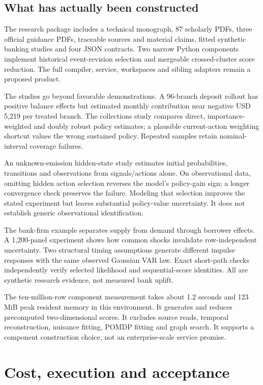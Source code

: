 \documentclass[11pt,a4paper,openany]{book}
\begin{document}
\section*{What has actually been constructed}
The research package includes a technical monograph, 87 scholarly PDFs,
three official guidance PDFs, traceable sources and material claims, fitted
synthetic banking studies and four JSON contracts. Two narrow Python
components implement historical event-revision selection and mergeable
crossed-cluster score reduction. The full compiler, service, workspaces
and sibling adapters remain a proposed product.

The studies go beyond favorable demonstrations. A 96-branch deposit rollout
has positive balance effects but estimated monthly contribution near negative
USD\,5,219 per treated branch. The collections study compares direct,
importance-weighted and doubly robust policy estimates; a plausible
current-action weighting shortcut values the wrong sustained policy.
Repeated samples retain nominal-interval coverage failures.

An unknown-emission hidden-state study estimates initial probabilities,
transitions and observations from signals/actions alone. On observational
data, omitting hidden action selection reverses the model's policy-gain
sign; a longer convergence check preserves the failure. Modeling that
selection improves the stated experiment but leaves substantial policy-value
uncertainty. It does not establish generic observational identification.

The bank-firm example separates supply from demand through borrower effects.
A 1,200-panel experiment shows how common shocks invalidate row-independent
uncertainty. Two structural timing assumptions generate different impulse
responses with the same observed Gaussian VAR law. Exact short-path checks
independently verify selected likelihood and sequential-score identities.
All are synthetic research evidence, not measured bank uplift.

The ten-million-row component measurement takes about 1.2 seconds and
123 MiB peak resident memory in this environment. It generates and reduces
precomputed two-dimensional scores. It excludes source reads, temporal
reconstruction, nuisance fitting, POMDP fitting and graph search. It supports
a component construction choice, not an enterprise-scale service promise.

\chapter*{Cost, execution and acceptance}
\end{document}
